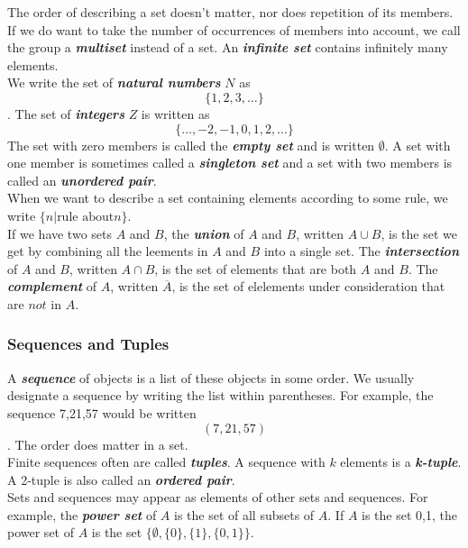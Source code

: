 \documentclass{article}
\newcommand{\define}[1]{\textbf{\textit{#1}}}
\begin{document}
The order of describing a set doesn't matter, nor does repetition of its members. If we do want to take the number of occurrences of members into account, we call the group a \define{multiset} instead of a set. An \define{infinite set} contains infinitely many elements. \\ 

We write the set of \define{natural numbers} $N$ as $$\{1,2,3,\dots\}$$. The set of \define{integers} $Z$ is written as $$\{\dots,-2,-1,0,1,2,\dots\}$$ The set with zero members is called the \define{empty set} and is written $\emptyset$. A set with one member is sometimes called a \define{singleton set} and a set with two members is called an \define{unordered pair}. \\ 

When we want to describe a set containing elements according to some rule, we write $\{n \vert \textrm{rule about} n\}$. \\ 

If we have two sets $A$ and $B$, the \define{union} of $A$ and $B$, written $A \cup B$, is the set we get by combining all the leements in $A$ and $B$ into a single set. The \define{intersection} of $A$ and $B$, written $A \cap B$, is the set of elements that are both $A$ and $B$. The \define{complement} of $A$, written $\overline{A}$, is the set of elelements under consideration that are $not$ in $A$. \\ 

\subsubsection{Sequences and Tuples}

A \define{sequence} of objects is a list of these objects in some order. We usually designate a sequence by writing the list within parentheses. For example, the sequence 7,21,57 would be written $$(7,21,57)$$. The order does matter in a set. \\ 

Finite sequences often are called \define{tuples}. A sequence with $k$ elements is a \define{k-tuple}. A 2-tuple is also called an \define{ordered pair}. \\ 

Sets and sequences may appear as elements of other sets and sequences. For example, the \define{power set} of $A$ is the set of all subsets of $A$. If $A$ is the set {0,1}, the power set of $A$ is the set $\{\emptyset, \{0\}, \{1\}, \{0,1\}\}$. \\ 
\end{document}

